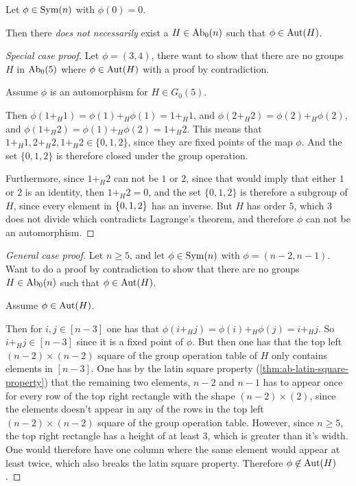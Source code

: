 \begin{counterexample}
    Let \( \phi \in \operatorname{Sym}(n) \) with \( \phi(0) = 0 \).
    
    Then there \emph{does not necessarily} exist a \( H \in \operatorname{Ab}_0(n) \) such that \( \phi \in \operatorname{Aut}(H) \).
\end{counterexample}
\begin{proof}[Special case proof]
    Let \( \phi = (3, 4) \), there want to show that there are no groups \( H \) in \( \operatorname{Ab}_0(5) \) where \( \phi \in \operatorname{Aut}(H) \) with a proof by contradiction.

    Assume \( \phi \) is an automorphism for \( H \in G_0(5) \).

    Then \( \phi(1 +_H 1) = \phi(1) +_H \phi(1) = 1 +_H 1 \), and \( \phi(2 +_H 2) = \phi(2) +_H \phi(2) \), and \( \phi(1 +_H 2) = \phi(1) +_H \phi(2) = 1 +_H 2 \). This means that \( 1 +_H 1, 2 +_H 2, 1 +_H 2 \in \{0, 1, 2\} \), since they are fixed points of the map \( \phi \). And the set \( \{ 0, 1, 2 \} \) is therefore closed under the group operation.

    Furthermore, since \( 1 +_H 2 \) can not be \( 1 \) or \( 2 \), since that would imply that either \( 1 \) or \( 2 \) is an identity, then \( 1 +_H 2 = 0 \), and the set \( \{ 0, 1, 2 \} \) is therefore a subgroup of \( H \), since every element in \( \left\{ 0, 1, 2 \right\} \) has an inverse. But \( H \) has order \( 5 \), which \( 3 \) does not divide which contradicts Lagrange's theorem, and therefore \( \phi \) can not be an automorphism.
\end{proof}
\begin{proof}[General case proof]
    Let \( n \geq 5 \), and let \( \phi \in \operatorname{Sym}(n) \) with \( \phi = (n-2, n-1) \). Want to do a proof by contradiction to show that there are no groups \( H \in \operatorname{Ab}_0(n) \) such that \( \phi \in \operatorname{Aut}(H) \).

    Assume \( \phi \in \operatorname{Aut}(H) \).

    Then for \( i, j \in [n-3] \) one has that \( \phi(i +_H j) = \phi(i) +_H \phi(j) = i +_H j \). So \( i +_H j \in [n - 3] \) since it is a fixed point of \( \phi \). But then one has that the top left \( (n - 2) \times (n - 2) \) square of the group operation table of \( H \) only contains elements in \( [n-3] \). One has by the latin square property (\autoref{thm:ab-latin-square-property}) that the remaining two elements, \( n - 2 \) and \( n - 1 \) has to appear once for every row of the top right rectangle with the shape \( (n - 2) \times (2) \), since the elements doesn't appear in any of the rows in the top left \( (n - 2) \times (n - 2) \) square of the group operation table. However, since \( n \geq 5 \), the top right rectangle has a height of at least \( 3 \), which is greater than it's width. One would therefore have one column where the same element would appear at least twice, which also breaks the latin square property. Therefore \( \phi \not\in \operatorname{Aut}(H) \).
\end{proof}

